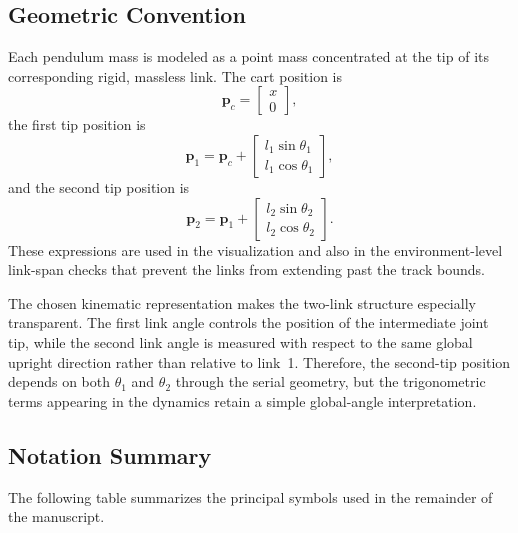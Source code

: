 \documentclass[conference]{IEEEtran}
\begin{document}
\subsection{Geometric Convention}
Each pendulum mass is modeled as a point mass concentrated at the tip of its corresponding rigid, massless link. The cart position is
\begin{equation}
\bm{p}_c = \begin{bmatrix} x \\ 0 \end{bmatrix},
\end{equation}
the first tip position is
\begin{equation}
\bm{p}_1 = \bm{p}_c + \begin{bmatrix} l_1 \sin\theta_1 \\ l_1 \cos\theta_1 \end{bmatrix},
\end{equation}
and the second tip position is
\begin{equation}
\bm{p}_2 = \bm{p}_1 + \begin{bmatrix} l_2 \sin\theta_2 \\ l_2 \cos\theta_2 \end{bmatrix}.
\end{equation}
These expressions are used in the visualization and also in the environment-level link-span checks that prevent the links from extending past the track bounds.

The chosen kinematic representation makes the two-link structure especially transparent. The first link angle controls the position of the intermediate joint tip, while the second link angle is measured with respect to the same global upright direction rather than relative to link~1. Therefore, the second-tip position depends on both $\theta_1$ and $\theta_2$ through the serial geometry, but the trigonometric terms appearing in the dynamics retain a simple global-angle interpretation.

\subsection{Notation Summary}
The following table summarizes the principal symbols used in the remainder of the manuscript.
\end{document}
